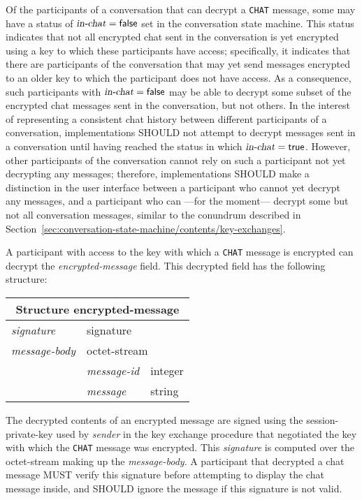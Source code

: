 \documentclass{article}
\def\message#1{\texttt{#1}}
\def\field#1{\textit{#1}}
\def\smfield#1{\textsl{#1}}
\def\type#1{\textsf{#1}}
\begin{document}
Of the participants of a conversation that can decrypt a \message{CHAT} message, some may have a status of $\smfield{in-chat} = \textsf{false}$ set in the conversation state machine.
This status indicates that not all encrypted chat sent in the conversation is yet encrypted using a key to which these participants have access; specifically, it indicates that there are participants of the conversation that may yet send messages encrypted to an older key to which the participant does not have access.
As a consequence, such participants with $\smfield{in-chat} = \textsf{false}$ may be able to decrypt some subset of the encrypted chat messages sent in the conversation, but not others.
In the interest of representing a consistent chat history between different participants of a conversation, implementations SHOULD not attempt to decrypt messages sent in a conversation until having reached the status in which $\smfield{in-chat} = \textsf{true}$.
However, other participants of the conversation cannot rely on such a participant not yet decrypting any messages; therefore, implementations SHOULD make a distinction in the user interface between a participant who cannot yet decrypt any messages, and a participant who can ---for the moment--- decrypt some but not all conversation messages, similar to the conundrum described in Section~\ref{sec:conversation-state-machine/contents/key-exchanges}.

A participant with access to the key with which a \message{CHAT} message is encrypted can decrypt the \field{encrypted-message} field.
This decrypted field has the following structure:

\vspace{-\medskipamount}
\hspace{2em minus 2em}\begin{tabular}{|l|l|l|}
\hline
\multicolumn{3}{|c|}{Structure \type{encrypted-message}} \\
\hline
\hline
\smfield{signature} & \multicolumn{2}{|l|}{\type{signature}} \\
\hline
\smfield{message-body} & \multicolumn{2}{|l|}{\type{octet-stream}} \\
\hline
& \smfield{message-id} & \type{integer} \\
\hline
& \smfield{message} & \type{string} \\
\hline
\end{tabular}
\vspace{-\medskipamount}

The decrypted contents of an encrypted message are signed using the session-private-key used by \field{sender} in the key exchange procedure that negotiated the key with which the \message{CHAT} message was encrypted.
This \field{signature} is computed over the \type{octet-stream} making up the \field{message-body}.
A participant that decrypted a chat message MUST verify this signature before attempting to display the chat message inside, and SHOULD ignore the message if this signature is not valid.
\end{document}
